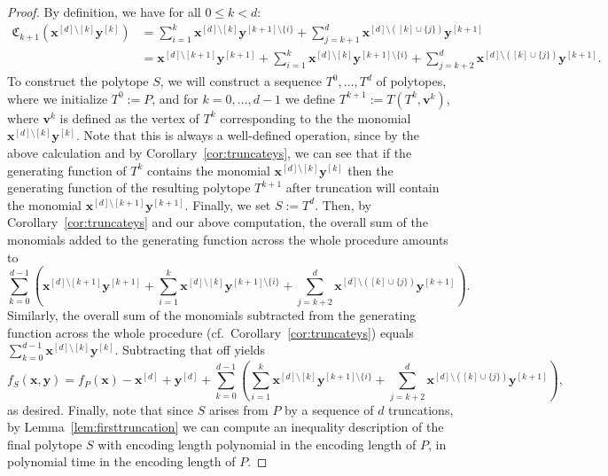 \documentclass[centering,11pt,reqno]{amsart}
\theoremstyle{definition}
\begin{document}
\begin{proof}
By definition, we have for all $0 \leq k < d$: 
\begin{align*}
\mathfrak{C}_{k+1}(\mathbf{x}^{[d] \setminus [k]} \mathbf{y}^{[k]}) &=\sum_{i=1}^{k} \mathbf{x}^{[d] \setminus [k]}\mathbf{y}^{[k+1] \setminus \{i\}} + \sum_{j=k+1}^{d}\mathbf{x}^{[d] \setminus ([k] \cup \{j\})} \mathbf{y}^{[k+1]} \\
&= \mathbf{x}^{[d]\setminus [k+1]}\mathbf{y}^{[k+1]} + \sum_{i=1}^{k} \mathbf{x}^{[d] \setminus [k]}\mathbf{y}^{[k+1]\setminus \{i\}} + \sum_{j=k+2}^{d }\mathbf{x}^{[d] \setminus ([k] \cup \{j\})} \mathbf{y}^{[k+1]}.
\end{align*}
To construct the polytope $S$, we will construct a sequence $T^0,\ldots,T^{d}$ of polytopes, where we initialize $T^0:=P$, and for $k=0,\ldots,d-1$ we define $T^{k+1}:=T(T^{k},\mathbf{v}^{k})$, where $\mathbf{v}^{k}$ is defined as the vertex of $T^{k}$ corresponding to the the monomial $\mathbf{x}^{[d]\setminus[k]}\mathbf{y}^{[k]}$. Note that this is always a well-defined operation, since by the above calculation and by Corollary~\ref{cor:truncateys}, we can see that if the generating function of $T^{k}$ contains the monomial  $\mathbf{x}^{[d]\setminus[k]}\mathbf{y}^{[k]}$ then the generating function of the resulting polytope $T^{k+1}$ after truncation will contain the monomial $\mathbf{x}^{[d] \setminus [k+1]} \mathbf{y}^{[k+1]}$. Finally, we set $S:=T^{d}$. Then, by Corollary~\ref{cor:truncateys} and our above computation, the overall sum of the monomials added to the generating function across the whole procedure amounts to
\[ \sum_{k=0}^{d-1} \left(\mathbf{x}^{[d]\setminus [k+1]}\mathbf{y}^{[k+1]} + \sum_{i=1}^{k} \mathbf{x}^{[d] \setminus [k]}\mathbf{y}^{[k+1]\setminus \{i\}} + \sum_{j=k+2}^{d }\mathbf{x}^{[d] \setminus ([k] \cup \{j\})} \mathbf{y}^{[k+1]} \right).\]
Similarly, the overall sum of the monomials subtracted from the generating function across the whole procedure (cf.~Corollary~\ref{cor:truncateys}) equals $\sum_{k=0}^{d-1} \mathbf{x}^{[d] \setminus [k]}\mathbf{y}^{[k]}$. Subtracting that off yields 
\[f_{S}(\mathbf{x}, \mathbf{y}) = f_{P}(\mathbf{x}) - \mathbf{x}^{[d]} + \mathbf{y}^{[d]} + \sum_{k=0}^{d-1} \left(\sum_{i=1}^{k} \mathbf{x}^{[d] \setminus [k]} \mathbf{y}^{[k+1] \setminus \{i\}} + \sum_{j=k+2}^{d} \mathbf{x}^{[d] \setminus ([k] \cup \{j\})} \mathbf{y}^{[k+1]} \right),\] as desired. Finally, note that since $S$ arises from $P$ by a sequence of $d$ truncations, by Lemma~\ref{lem:firsttruncation} we can compute an inequality description of the final polytope $S$ with encoding length polynomial in the encoding length of $P$, in polynomial time in the encoding length of $P$.
\end{proof}
\end{document}
